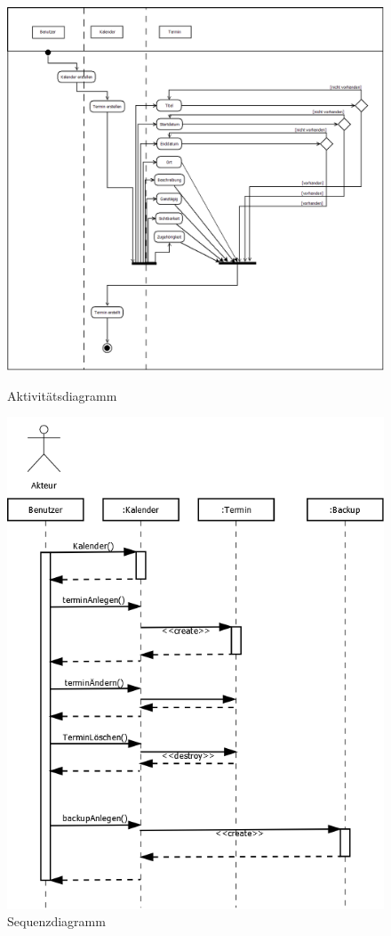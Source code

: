 \documentclass[a4paper]{article}
\begin{document}
	\begin{figure}
		\centering
		\caption{Aktivitätsdiagramm}
		\includegraphics[width=1.0\linewidth]{Aktivitaetsdiagramm}
		\label{fig:Aktivitaetsdiagramm}
	\end{figure}
	
	\begin{figure}
		\centering
		\caption{Sequenzdiagramm}
		\label{fig:Sequenzdiagramm}
		\includegraphics[width=1.0\linewidth]{Sequenzdiagramm}
	\end{figure}
\end{document}
